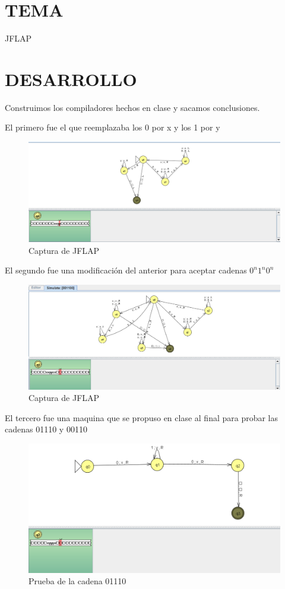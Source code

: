 \documentclass[12pt]{article}
\begin{document}
\section*{TEMA}
JFLAP
\vspace{0.5cm}


\section*{DESARROLLO}
Construimos los compiladores hechos en clase y sacamos conclusiones.

El primero fue el que reemplazaba los 0 por x y los 1 por y
\begin{figure}[H]
\centering
\includegraphics[width=1\textwidth]{./inFiles/Figures/Cap1.png}
\caption{Captura de JFLAP}
\end{figure}

El segundo fue una modificación del anterior para aceptar cadenas $0^n1^n0^n$

\begin{figure}[H]
\centering
\includegraphics[width=1\textwidth]{./inFiles/Figures/Cap2.png}
\caption{Captura de JFLAP}
\end{figure}

El tercero fue una maquina que se propuso en clase al final para probar las cadenas 01110 y 00110
\begin{figure}[H]
\centering
\includegraphics[width=1\textwidth]{./inFiles/Figures/Cap3.png}
\caption{Prueba de la cadena 01110}
\end{figure}
\end{document}
